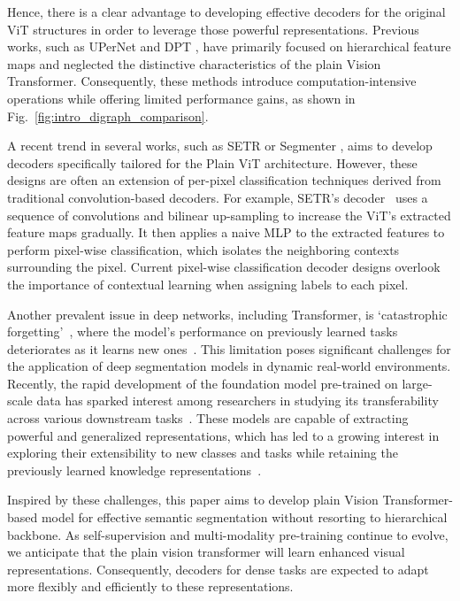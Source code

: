 Hence, there is a clear advantage to developing effective decoders for the original ViT structures in order to leverage those powerful representations.
Previous works, such as UPerNet \cite{Upernet} and DPT \cite{DPT}, have primarily focused on hierarchical feature maps and neglected the distinctive characteristics of the plain Vision Transformer.
Consequently, these methods introduce computation-intensive operations while offering limited performance gains, as shown in Fig.~\ref{fig:intro_digraph_comparison}.

A recent trend in several works, such as SETR \cite{setr} or Segmenter \cite{strudel2021segmenter}, aims to develop decoders specifically tailored for the Plain ViT architecture.
However, these designs are often an extension of per-pixel classification techniques derived from traditional convolution-based decoders.
For example, SETR's decoder~\cite{setr} uses a sequence of convolutions and bilinear up-sampling to increase the ViT's extracted feature maps gradually.
 It then applies a naive MLP to the extracted features to perform pixel-wise classification, which isolates the neighboring contexts surrounding the pixel. 
 Current pixel-wise classification decoder designs overlook the importance of contextual learning when assigning labels to each pixel.

Another prevalent issue in deep networks, including Transformer, is `catastrophic forgetting'~\cite{french1999catastrophic, kirkpatrick2017overcoming}, where the model's performance on previously learned tasks deteriorates as it learns new ones~\cite{shao2022overcoming, wang2022learning, wang2022dualprompt,phan2022class}. This limitation poses significant challenges for the application of deep segmentation models in dynamic real-world environments.
Recently, the rapid development of the foundation model pre-trained on large-scale data has sparked interest among researchers in studying its transferability across various downstream tasks~\cite{ostapenko2022continual}.
These models are capable of extracting powerful and generalized representations, which has led to a growing interest in exploring their extensibility to new classes and tasks while retaining the previously learned knowledge representations~\cite{ramasesh2022effect, wu2022pretrained}.  

Inspired by these challenges, this paper aims to develop plain Vision Transformer-based model for effective semantic segmentation without resorting to hierarchical backbone.
As self-supervision and multi-modality pre-training continue to evolve, we anticipate that the plain vision transformer will learn enhanced visual representations. Consequently, decoders for dense tasks are expected to adapt more flexibly and efficiently to these representations. 

